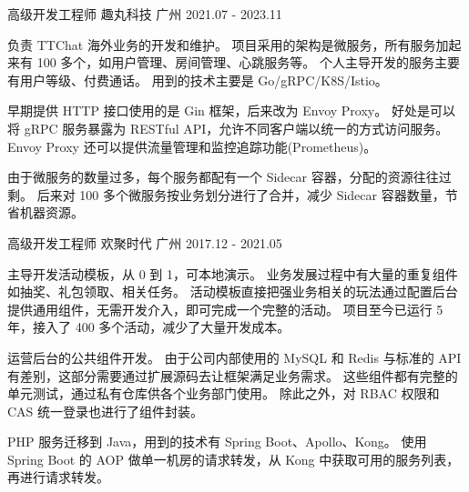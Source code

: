

\begin{cventries}

  \cventry
    {高级开发工程师} %
    {趣丸科技} %
    {广州} %
    {2021.07 - 2023.11} %
    {
      \begin{cvitems} %
        \item
        {
          负责 TTChat 海外业务的开发和维护。
          项目采用的架构是微服务，所有服务加起来有 100 多个，如用户管理、房间管理、心跳服务等。
          个人主导开发的服务主要有用户等级、付费通话。
          用到的技术主要是 Go/gRPC/K8S/Istio。
        }
        \item {
          早期提供 HTTP 接口使用的是 Gin 框架，后来改为 Envoy Proxy。
          好处是可以将 gRPC 服务暴露为 RESTful API，允许不同客户端以统一的方式访问服务。
          Envoy Proxy 还可以提供流量管理和监控追踪功能(Prometheus)。
        }
        \item {
          由于微服务的数量过多，每个服务都配有一个 Sidecar 容器，分配的资源往往过剩。
          后来对 100 多个微服务按业务划分进行了合并，减少 Sidecar 容器数量，节省机器资源。
        }
      \end{cvitems}
    }

  \cventry
    {高级开发工程师} %
    {欢聚时代} %
    {广州} %
    {2017.12 - 2021.05} %
    {
      \begin{cvitems} %
        \item
        {
          主导开发活动模板，从 0 到 1，可本地演示。
          业务发展过程中有⼤量的重复组件如抽奖、礼包领取、相关任务。
          活动模板直接把强业务相关的玩法通过配置后台提供通用组件，无需开发介⼊，即可完成⼀个完整的活动。
          项目⾄今已运行 5 年，接入了 400 多个活动，减少了⼤量开发成本。
        }
        \item
        {
          运营后台的公共组件开发。
          由于公司内部使用的 MySQL 和 Redis 与标准的 API 有差别，这部分需要通过扩展源码去让框架满足业务需求。
          这些组件都有完整的单元测试，通过私有仓库供各个业务部门使用。
          除此之外，对 RBAC 权限和 CAS 统⼀登录也进行了组件封装。
        }
        \item
        {
          PHP 服务迁移到 Java，⽤到的技术有 Spring Boot、Apollo、Kong。
          使⽤ Spring Boot 的 AOP 做单⼀机房的请求转发，从 Kong 中获取可⽤的服务列表，再进⾏请求转发。
        }
      \end{cvitems}
    }


\end{cventries}
